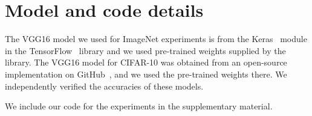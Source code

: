 \documentclass{article}
\newcommand{\pl}[1]{\textcolor{red}{[PL: #1]}}
\begin{document}













% 




\appendix

% 
\newpage 
\section{Model and code details}

The VGG16 model we used for ImageNet experiments is from the Keras~\cite{chollet2015} module in the TensorFlow~\cite{tensorflow2015-whitepaper} library and we used pre-trained weights supplied by the library. The VGG16 model for CIFAR-10 was obtained from an open-source implementation on GitHub~\cite{geifman2017}, and we used the pre-trained weights there. We independently verified the accuracies of these models.

We include our code for the experiments in the supplementary material.












\end{document}
